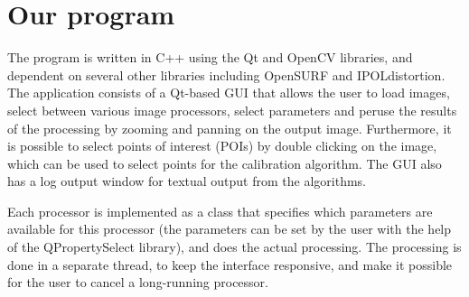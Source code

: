 \section{Our program}
The program is written in C++ using the Qt and OpenCV libraries, and
dependent on several other libraries including OpenSURF and IPOLdistortion.
The application consists of a Qt-based GUI that allows the user to load
images, select between various image processors, select parameters and
peruse the results of the processing by zooming and panning on the
output image. Furthermore, it is possible to select points of interest
(POIs) by double clicking on the image, which can be used to select
points for the calibration algorithm. The GUI also has a log output
window for textual output from the algorithms.

Each processor is implemented as a class that specifies which
parameters are available for this processor (the parameters can be set
by the user with the help of the QPropertySelect library), and does
the actual processing. The processing is done in a separate thread, to
keep the interface responsive, and make it possible for the user to
cancel a long-running processor.







